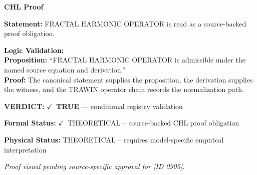 \vspace{0.45em}
\noindent\textbf{CHL Proof}\par
\textbf{Statement:} FRACTAL HARMONIC OPERATOR is read as a source-backed proof obligation.

\textbf{Logic Validation:}\\
\textbf{Proposition:} ``FRACTAL HARMONIC OPERATOR is admissible under the named source equation and derivation.''\\
\textbf{Proof:} The canonical statement supplies the proposition, the derivation supplies the witness, and the TRAWIN operator chain records the normalization path.

\textbf{VERDICT:} \ensuremath{\checkmark}\ \textbf{TRUE} --- conditional registry validation

\textbf{Formal Status:} \ensuremath{\checkmark}\ THEORETICAL -- source-backed CHL proof obligation

\textbf{Physical Status:} THEORETICAL -- requires model-specific empirical interpretation
\par\vspace{0.45em}
\par
\vfill
\begingroup\footnotesize\itshape
Proof visual pending source-specific approval for [ID 0905].
\par\endgroup
\vfill
\endgroup
\endgroup

